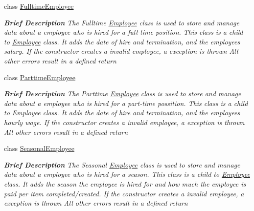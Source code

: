 \begin{DoxyCompactItemize}
class \hyperlink{class_all_employees_1_1_fulltime_employee}{Fulltime\+Employee}
\begin{DoxyCompactList}\small\item\em {\bfseries Brief Description} The Fulltime \hyperlink{class_all_employees_1_1_employee}{Employee} class is used to store and manage data about a employee who is hired for a full-\/time position. This class is a child to \hyperlink{class_all_employees_1_1_employee}{Employee} class. It adds the date of hire and termination, and the employees salary. If the constructor creates a invalid employee, a exception is thrown All other errors result in a defined return \end{DoxyCompactList}\item 
class \hyperlink{class_all_employees_1_1_parttime_employee}{Parttime\+Employee}
\begin{DoxyCompactList}\small\item\em {\bfseries Brief Description} The Parttime \hyperlink{class_all_employees_1_1_employee}{Employee} class is used to store and manage data about a employee who is hired for a part-\/time possition. This class is a child to \hyperlink{class_all_employees_1_1_employee}{Employee} class. It adds the date of hire and termination, and the employees hourly wage. If the constructor creates a invalid employee, a exception is thrown All other errors result in a defined return \end{DoxyCompactList}\item 
class \hyperlink{class_all_employees_1_1_seasonal_employee}{Seasonal\+Employee}
\begin{DoxyCompactList}\small\item\em {\bfseries Brief Description} The Seasonal \hyperlink{class_all_employees_1_1_employee}{Employee} class is used to store and manage data about a employee who is hired for a season. This class is a child to \hyperlink{class_all_employees_1_1_employee}{Employee} class. It adds the season the employee is hired for and how much the employee is paid per item completed/created. If the constructor creates a invalid employee, a exception is thrown All other errors result in a defined return \end{DoxyCompactList}\end{DoxyCompactItemize}
